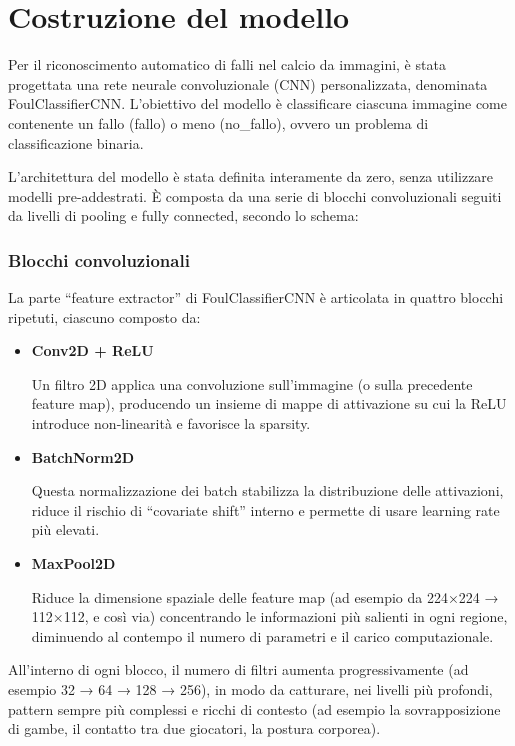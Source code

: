 \documentclass[main.tex]{subfiles}
\begin{document}
\section{Costruzione del modello}\label{sec:cap 4}

Per il riconoscimento automatico di falli nel calcio da immagini, è stata progettata una rete neurale convoluzionale (CNN) personalizzata, denominata FoulClassifierCNN. L'obiettivo del modello è classificare ciascuna immagine come contenente un fallo (fallo) o meno (no\_fallo), ovvero un problema di classificazione binaria.

\noindent L'architettura del modello è stata definita interamente da zero, senza utilizzare modelli pre-addestrati. È composta da una serie di blocchi convoluzionali seguiti da livelli di pooling e fully connected, secondo lo schema:

\subsubsection*{Blocchi convoluzionali}

La parte “feature extractor” di FoulClassifierCNN è articolata in quattro blocchi ripetuti, ciascuno composto da:

\begin{itemize}
    \item \textbf{Conv2D + ReLU}

 Un filtro 2D applica una convoluzione sull’immagine (o sulla precedente feature map), producendo un insieme di mappe di attivazione su cui la ReLU introduce non-linearità e favorisce la sparsity.
    \item \textbf{BatchNorm2D}

 Questa normalizzazione dei batch stabilizza la distribuzione delle attivazioni, riduce il rischio di “covariate shift” interno e permette di usare learning rate più elevati.
    \item \textbf{MaxPool2D}

 Riduce la dimensione spaziale delle feature map (ad esempio da 224×224 → 112×112, e così via) concentrando le informazioni più salienti in ogni regione, diminuendo al contempo il numero di parametri e il carico computazionale.
\end{itemize}
All’interno di ogni blocco, il numero di filtri aumenta progressivamente (ad esempio 32 → 64 → 128 → 256), in modo da catturare, nei livelli più profondi, pattern sempre più complessi e ricchi di contesto (ad esempio la sovrapposizione di gambe, il contatto tra due giocatori, la postura corporea).
\end{document}
